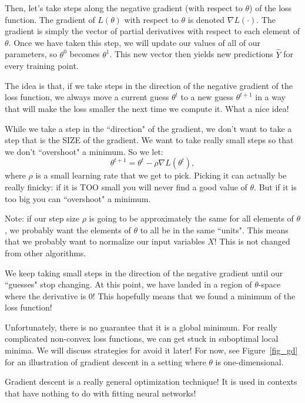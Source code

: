 Then, let's take steps along the negative gradient (with respect to $\theta$) of the loss function. The gradient of $L(\theta)$ with respect to $\theta$ is denoted $\nabla L(\cdot)$. The gradient is simply the vector of partial derivatives with respect to each element of $\theta$.  Once we have taken this step, we will update our values of all of our parameters, so $\theta^{0}$ becomes $\theta^{1}$. This new vector then yields new predictions $\hat{Y}$ for every training point.

The idea is that, if we take steps in the direction of the negative gradient of the loss function, we always move a current guess $\theta^t$ to a new guess $\theta^{t+1}$ in a way that will make the loss smaller the next time we compute it. What a nice idea!

While we take a step in the ``direction" of the gradient, we don't want to take a step that is the SIZE of the gradient. We want to take really small steps so that we don't ``overshoot" a minimum. So we let: 
$$
\theta^{t+1} = \theta^t - \rho \nabla L(\theta^{t}),
$$
where $\rho$ is a small learning rate that we get to pick. Picking it can actually be really finicky: if it is TOO small you will never find a good value of $\theta$. But if it is too big you can ``overshoot" a minimum. 

Note: if our step size $\rho$ is going to be approximately the same for all elements of $\theta$, we probably want the elements of $\theta$ to all be in the same ``units". This means that we probably want to normalize our input variables $X$! This is not changed from other algorithms. 

We keep taking small steps in the direction of the negative gradient until our ``guesses" stop changing. At this point, we have landed in a region of $\theta$-space where the derivative is 0! This hopefully means that we found a minimum of the loss function!

Unfortunately, there is no guarantee that it is a global minimum. For really complicated non-convex loss functions, we can get stuck in suboptimal local minima. We will discuss strategies for avoid it later! For now, see Figure~\ref{fig_gd} for an illustration of gradient descent in a setting where $\theta$ is one-dimensional. 

Gradient descent is a really general optimization technique! It is used in contexts that have nothing to do with fitting neural networks!

